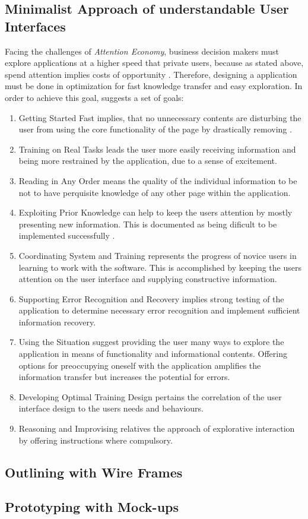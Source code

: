 \subsection{Minimalist Approach of understandable User Interfaces}
Facing the challenges of \textit{Attention Economy}, business decision makers must explore applications at a higher speed that private users, because as stated above, spend attention implies costs of opportunity \parencite[cf.][]{Bakar.2017}. Therefore, designing a application must be done in optimization for fast knowledge transfer and easy exploration. In order to achieve this goal, \textcite{Bakar.2017} suggests a set of goals:
\begin{enumerate}
\item{Getting Started Fast} implies, that no unnecessary contents are disturbing the user from using the core functionality of the page by drastically removing   \parencite{Bakar.2017}.
\item{Training on Real Tasks} leads the user more easily receiving information and being more restrained by the application, due to a sense of excitement.
\item{Reading in Any Order} means the quality of the individual information to be not to have perquisite knowledge of any other page within the application.
\item{Exploiting Prior Knowledge} can help to keep the users attention by mostly presenting new information. This is documented as being dificult to be implemented successfully .
\item{Coordinating System and Training} represents the progress of novice users in learning to work with the software. This is accomplished by keeping the users attention on the user interface and supplying constructive information.
\item{Supporting Error Recognition and Recovery} implies strong testing of the application to determine necessary error recognition and implement sufficient information recovery.
\item{Using the Situation} suggest providing the user many ways to explore the application in means of functionality and informational contents. Offering options for preoccupying oneself with the application amplifies the information transfer but increases the potential for errors.
\item{Developing Optimal Training Design} pertains the correlation of the user interface design to the users needs and behaviours. 
\item{Reasoning and Improvising} relatives the approach of explorative interaction by offering instructions where compulsory.
\end{enumerate}


\subsection{Outlining with Wire Frames}


\subsection{Prototyping with Mock-ups}